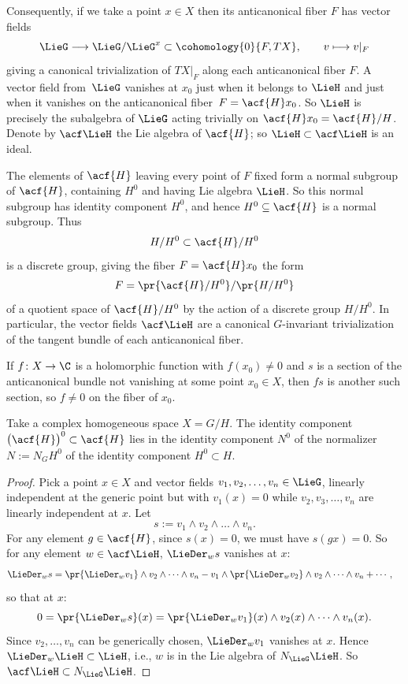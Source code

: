 Consequently, if we take a point $x \in X$ then its anticanonical fiber $F$ has vector fields
\[
\LieG \longrightarrow \LieG/\LieG^x \subset \cohomology{0}{F, TX}, \qquad
v \longmapsto v|_F
\]
giving a canonical trivialization of $ TX|_F$ along each anticanonical fiber $F$.
A vector field from~$\LieG$ vanishes at $x_0$ just when it belongs to $\LieH$ and just when it vanishes on the anticanonical
fiber~${F = \acf{H}x_0}$.
So $\LieH$ is precisely the subalgebra of $\LieG$ acting trivially on $\acf{H}x_0 = \acf{H}/H$.
Denote by $\acf\LieH$ the Lie algebra of $\acf{H}$; so $\LieH \subset \acf\LieH$ is an ideal.

The elements of $\acf{H}$ leaving every point of $F$ fixed form a normal subgroup of $\acf{H}$, containing $H^0$ and having Lie algebra $\LieH$.
So this normal subgroup has identity component $H^0$, and hence $H^0 \subseteq \acf{H}$ is a normal subgroup.
Thus
\[
H/H^0 \subset \acf{H}/H^0
\]
is a discrete group, giving the fiber $F = \acf{H}x_0$ the form
\[
F = \pr{\acf{H}/H^0}/\pr{H/H^0}
\]
of a quotient space of $\acf{H}/H^0$ by the action of a discrete group $H/H^0$.
In particular, the vector fields $\acf\LieH$ are a canonical $G$-invariant trivialization of the tangent bundle of each anticanonical fiber.

If $f \colon X \to \C$ is a holomorphic function with $f(x_0) \ne 0$ and $s$ is a section of the anticanonical bundle not vanishing at some point $x_0 \in X$, then $fs$ is another such section, so $f\ne 0$ on the fiber of $x_0$.

\begin{Lemma}
Take a complex homogeneous space $X = G/H$.
The identity component $\big(\acf{H}\big)^0 \subset \acf{H}$ lies in the identity component $N^0$ of the
normalizer $N := N_G H^0$ of the identity component $H^0 \subset H$.
\end{Lemma}

\begin{proof}
Pick a point $x \in X$ and vector fields $v_1, v_2, \dots, v_n \in \LieG$, linearly independent at the generic point
but with $v_1(x) = 0$ while $v_2, v_3, \dots, v_n$ are linearly independent at $x$.
Let
\[
s := v_1 \wedge v_2 \wedge \dots \wedge v_n.
\]
For any element $g \in \acf{H}$, since $s(x) = 0$, we must have $s(gx) = 0$.
So for any element $w \in \acf\LieH$, $\LieDer_w s$ vanishes at $x$:
\begin{align*}
\LieDer_w s
& =
\pr{\LieDer_w v_1} \wedge v_2 \wedge \dots \wedge v_n - v_1 \wedge \pr{\LieDer_w v_2} \wedge v_2 \wedge \dots \wedge v_n + \cdots,
\end{align*}
so that at $x$:
\[
0 = \pr{\LieDer_w s}(x) = \pr{\LieDer_w v_1}(x) \wedge v_2(x) \wedge \dots \wedge v_n(x).
\]
Since $v_2, \dots, v_n$ can be generically chosen, $\LieDer_w v_1$ vanishes at $x$.
Hence $\LieDer_w \LieH \subset \LieH$, i.e., $w$ is in the Lie algebra of $N_{\LieG} \LieH$.
So $\acf\LieH \subset N_{\LieG} \LieH$.
\end{proof}

